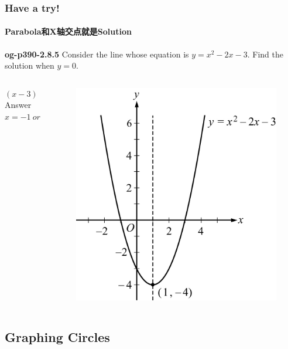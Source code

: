 \documentclass[
	11pt, %
]{beamer}
\begin{document}

\begin{frame}
	\frametitle{Have a try!}
	\framesubtitle{Parabola和X轴交点就是Solution}
   \textbf{og-p390-2.8.5} Consider the line whose equation is $y = x^2 - 2x - 3$. Find the solution when $y = 0$.
	\begin{columns}[t] 
		\begin{column}{0.4\textwidth} %
		\pause
		$(x- 3)(x+ 1) = 0$\\
		\bigskip
    Answer \textbf{$x  = -1 \ or \ 3 $}
		\end{column}
		\begin{column}{0.6\textwidth} %
		  \begin{figure}
				\includegraphics[width=0.6\linewidth]{Graphing_Quadratic_Equations.jpg} 
			\end{figure}
    \end{column}
	\end{columns}
\end{frame}



\subsection{Graphing Circles}

\end{document}
